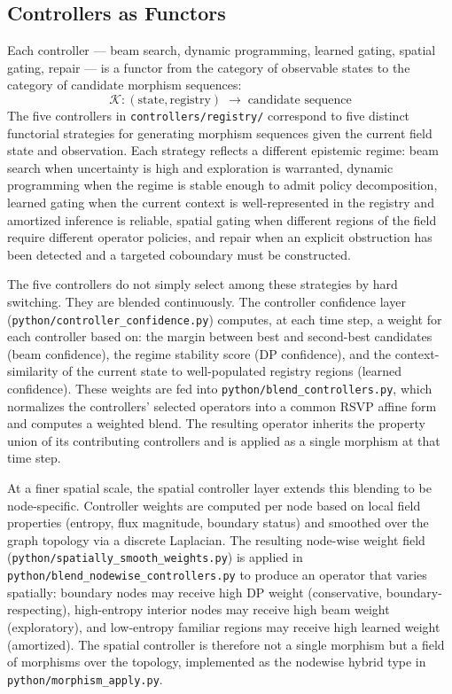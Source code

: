 \documentclass[12pt, oneside]{article}
\begin{document}
\subsection{Controllers as Functors}

Each controller --- beam search, dynamic programming, learned gating, spatial gating,
repair --- is a functor from the category of observable states to the category of
candidate morphism sequences:
\[
\mathcal{K} : (\text{state}, \text{registry}) \;\longrightarrow\; \text{candidate sequence}
\]
The five controllers in \texttt{controllers/registry/} correspond to five distinct
functorial strategies for generating morphism sequences given the current field state and
observation. Each strategy reflects a different epistemic regime: beam search when
uncertainty is high and exploration is warranted, dynamic programming when the regime is
stable enough to admit policy decomposition, learned gating when the current context is
well-represented in the registry and amortized inference is reliable, spatial gating when
different regions of the field require different operator policies, and repair when an
explicit obstruction has been detected and a targeted coboundary must be constructed.

The five controllers do not simply select among these strategies by hard switching.
They are blended continuously. The controller confidence layer
(\texttt{python/controller\_confidence.py}) computes, at each time step, a weight for
each controller based on: the margin between best and second-best candidates (beam
confidence), the regime stability score (DP confidence), and the context-similarity of
the current state to well-populated registry regions (learned confidence). These weights
are fed into \texttt{python/blend\_controllers.py}, which normalizes the controllers'
selected operators into a common RSVP affine form and computes a weighted blend. The
resulting operator inherits the property union of its contributing controllers and is
applied as a single morphism at that time step.

At a finer spatial scale, the spatial controller layer extends this blending to be
node-specific. Controller weights are computed per node based on local field properties
(entropy, flux magnitude, boundary status) and smoothed over the graph topology via a
discrete Laplacian. The resulting node-wise weight field
(\texttt{python/spatially\_smooth\_weights.py}) is applied in
\texttt{python/blend\_nodewise\_controllers.py} to produce an operator that varies
spatially: boundary nodes may receive high DP weight (conservative, boundary-respecting),
high-entropy interior nodes may receive high beam weight (exploratory), and
low-entropy familiar regions may receive high learned weight (amortized). The spatial
controller is therefore not a single morphism but a field of morphisms over the topology,
implemented as the nodewise hybrid type in \texttt{python/morphism\_apply.py}.
\end{document}
